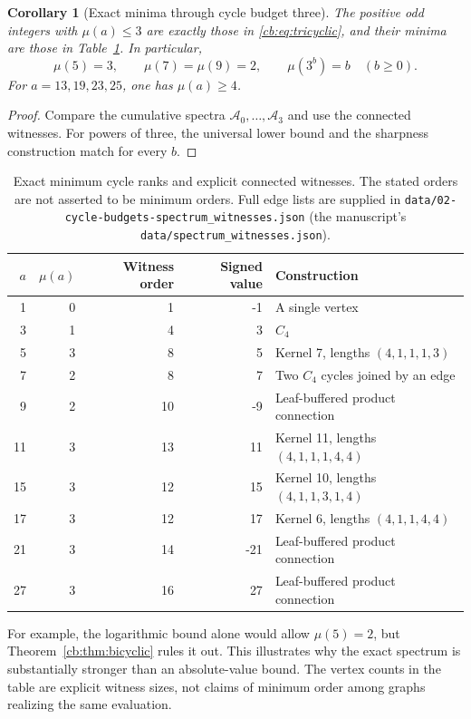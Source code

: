 \documentclass[11pt]{article}
\numberwithin{equation}{section}
\newtheorem{corollary}[theorem]{Corollary}
\theoremstyle{definition}
\begin{document}
\begin{corollary}[Exact minima through cycle budget three]\label{cb:cor:mu}
The positive odd integers with $\mu(a)\le3$ are exactly those in
\eqref{cb:eq:tricyclic}, and their minima are those in
Table~\ref{cb:tab:witnesses}. In particular,
\[
 \mu(5)=3,\qquad \mu(7)=\mu(9)=2,\qquad
 \mu(3^b)=b\quad(b\ge0).
\]
For $a=13,19,23,25$, one has $\mu(a)\ge4$.
\end{corollary}
\begin{proof}
Compare the cumulative spectra $\mathcal A_0,\ldots,\mathcal A_3$ and use
the connected witnesses. For powers of three, the universal lower bound
and the sharpness construction match for every $b$.
\end{proof}

\begin{table}[htbp]
\centering
\begin{tabular}{rrrrl}
\toprule
$a$ & $\mu(a)$ & Witness order & Signed value & Construction\\\midrule
1 & 0 & 1 & -1 & A single vertex\\
3 & 1 & 4 & 3 & $C_4$\\
5 & 3 & 8 & 5 & Kernel 7, lengths $(4,1,1,1,3)$\\
7 & 2 & 8 & 7 & Two $C_4$ cycles joined by an edge\\
9 & 2 & 10 & -9 & Leaf-buffered product connection\\
11 & 3 & 13 & 11 & Kernel 11, lengths $(4,1,1,1,4,4)$\\
15 & 3 & 12 & 15 & Kernel 10, lengths $(4,1,1,3,1,4)$\\
17 & 3 & 12 & 17 & Kernel 6, lengths $(4,1,1,4,4)$\\
21 & 3 & 14 & -21 & Leaf-buffered product connection\\
27 & 3 & 16 & 27 & Leaf-buffered product connection\\
\bottomrule
\end{tabular}
\caption{Exact minimum cycle ranks and explicit connected witnesses.
The stated orders are not asserted to be minimum orders. Full edge lists
are supplied in \nolinkurl{data/02-cycle-budgets-spectrum_witnesses.json}
(the manuscript's \texttt{data/spectrum\_witnesses.json}).}
\label{cb:tab:witnesses}
\end{table}


For example, the logarithmic bound alone would allow $\mu(5)=2$, but
Theorem~\ref{cb:thm:bicyclic} rules it out. This illustrates why the exact
spectrum is substantially stronger than an absolute-value bound.
The vertex counts in the table are explicit witness sizes, not claims of
minimum order among graphs realizing the same evaluation.
\end{document}
